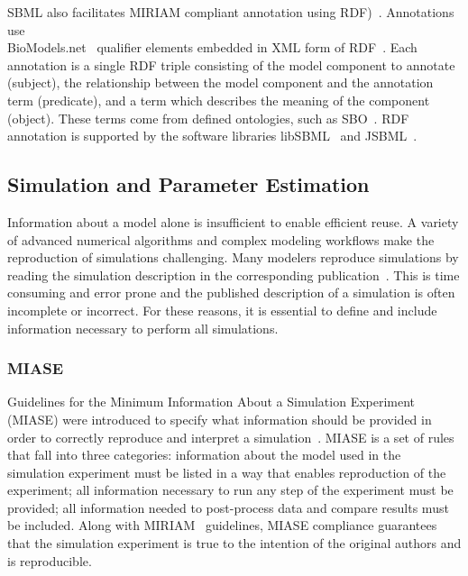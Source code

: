 \documentclass[12pt]{report}
\begin{document}
SBML also facilitates MIRIAM compliant annotation using RDF)~\cite{Swainston2009,Decker2000}. Annotations use \\BioModels.net~\cite{LeNovere2006} qualifier elements embedded in XML form of RDF~\cite{Hucka2019}. Each annotation is a single RDF triple consisting of the model component to annotate (subject), the relationship between the model component and the annotation term (predicate), and a term which describes the meaning of the component (object). These terms come from defined ontologies, such as SBO~\cite{SBO}. RDF annotation is supported by the software libraries libSBML~\cite{libSBML} and JSBML~\cite{Rodriguez2015}.



\subsection{Simulation and Parameter Estimation}
Information about a model alone is insufficient to enable efficient reuse. A variety of advanced numerical algorithms and complex modeling workflows make the reproduction of simulations challenging. Many modelers reproduce simulations by reading the simulation description in the corresponding publication~\cite{waltemath_minimum_2011}. This is time consuming and error prone and the published description of a simulation is often incomplete or incorrect. For these reasons, it is essential to define and include information necessary to perform all simulations.

\subsubsection{MIASE}
Guidelines for the Minimum Information About a Simulation Experiment (MIASE) were introduced to specify what information should be provided in order to correctly reproduce and interpret a simulation~\cite{waltemath_minimum_2011}. MIASE is a set of rules that fall into three categories: information about the model used in the simulation experiment must be listed in a way that enables reproduction of the experiment; all information necessary to run any step of the experiment must be provided; all information needed to post-process data and compare results must be included.  Along with MIRIAM~\cite{novere_minimum_2005} guidelines, MIASE compliance guarantees that the simulation experiment is true to the intention of the original authors and is reproducible. 
\end{document}
